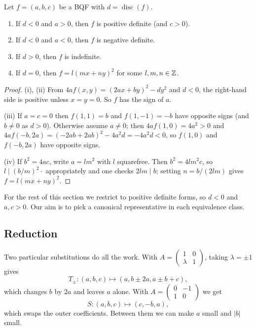 \documentclass[a4paper]{scrartcl}
\DeclareMathOperator{\disc}{disc}
\begin{document}
\begin{lemma}\label{lem:definite}
	Let $f = (a,b,c)$ be a BQF with $d = \disc(f)$.
	\begin{enumerate}[label=(\roman*)]
		\item If $d < 0$ and $a > 0$, then $f$ is positive definite (and $c > 0$).
		\item If $d < 0$ and $a < 0$, then $f$ is negative definite.
		\item If $d > 0$, then $f$ is indefinite.
		\item If $d = 0$, then $f = l(mx + ny)^2$ for some $l, m, n \in \mathbb{Z}$.
	\end{enumerate}
\end{lemma}
\begin{proof}
	(i), (ii) From $4af(x,y) = (2ax + by)^2 - dy^2$ and $d < 0$, the right-hand side is positive unless $x = y = 0$. So $f$ has the sign of $a$.

	(iii) If $a = c = 0$ then $f(1,1) = b$ and $f(1,-1) = -b$ have opposite signs (and $b \neq 0$ as $d > 0$). Otherwise assume $a \neq 0$; then $4af(1,0) = 4a^2 > 0$ and $4af(-b, 2a) = (-2ab + 2ab)^2 - 4a^2 d = -4a^2d < 0$, so $f(1,0)$ and $f(-b, 2a)$ have opposite signs.

	(iv) If $b^2 = 4ac$, write $a = l m^2$ with $l$ squarefree. Then $b^2 = 4lm^2c$, so $l \mid (b/m)^2 \cdot$ appropriately and one checks $2lm \mid b$; setting $n = b/(2lm)$ gives $f = l(mx + ny)^2$.
\end{proof}

For the rest of this section we restrict to positive definite forms, so $d < 0$ and $a, c > 0$. Our aim is to pick a canonical representative in each equivalence class.

\subsection{Reduction}

Two particular substitutions do all the work. With $A = \left(\begin{smallmatrix} 1 & 0 \\ \lambda & 1\end{smallmatrix}\right)$, taking $\lambda = \pm1$ gives
$$
T_\pm : (a, b, c) \longmapsto (a, b \pm 2a, a \pm b + c),
$$
which changes $b$ by $2a$ and leaves $a$ alone. With $A = \left(\begin{smallmatrix} 0 & -1 \\ 1 & 0\end{smallmatrix}\right)$ we get
$$
S : (a, b, c) \longmapsto (c, -b, a),
$$
which swaps the outer coefficients. Between them we can make $a$ small and $|b|$ small.
\end{document}
